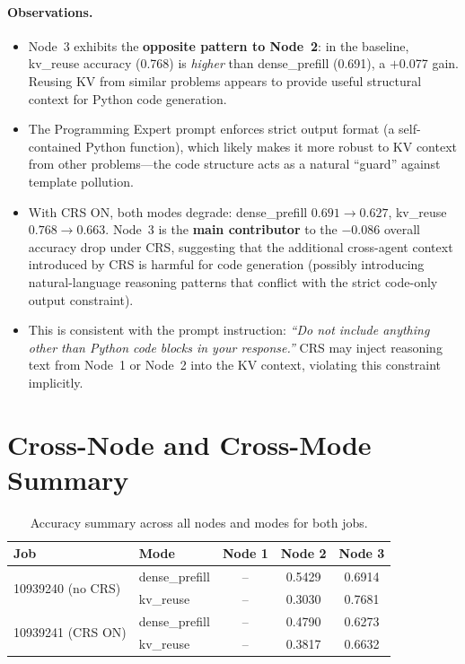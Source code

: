 \documentclass[11pt]{article}
\begin{document}
\paragraph{Observations.}
\begin{itemize}
  \item Node~3 exhibits the \textbf{opposite pattern to Node~2}: in the
        baseline, kv\_reuse accuracy (0.768) is \emph{higher} than
        dense\_prefill (0.691), a $+$0.077 gain.  Reusing KV from similar
        problems appears to provide useful structural context for Python code
        generation.
  \item The Programming Expert prompt enforces strict output format
        (a self-contained Python function), which likely makes it more
        robust to KV context from other problems---the code structure acts
        as a natural ``guard'' against template pollution.
  \item With CRS ON, both modes degrade: dense\_prefill $0.691 \to 0.627$,
        kv\_reuse $0.768 \to 0.663$.  Node~3 is the \textbf{main contributor}
        to the $-$0.086 overall accuracy drop under CRS, suggesting that
        the additional cross-agent context introduced by CRS is harmful for
        code generation (possibly introducing natural-language reasoning
        patterns that conflict with the strict code-only output constraint).
  \item This is consistent with the prompt instruction: \emph{``Do not include
        anything other than Python code blocks in your response.''} CRS may
        inject reasoning text from Node~1 or Node~2 into the KV context,
        violating this constraint implicitly.
\end{itemize}

\section{Cross-Node and Cross-Mode Summary}

\begin{table}[h]
\centering
\caption{Accuracy summary across all nodes and modes for both jobs.}
\label{tab:summary}
\begin{tabular}{llccc}
\toprule
\textbf{Job} & \textbf{Mode} & \textbf{Node 1} & \textbf{Node 2} & \textbf{Node 3} \\
\midrule
\multirow{2}{*}{10939240 (no CRS)}
  & dense\_prefill & -- & 0.5429 & 0.6914 \\
  & kv\_reuse      & -- & 0.3030 & 0.7681 \\
\midrule
\multirow{2}{*}{10939241 (CRS ON)}
  & dense\_prefill & -- & 0.4790 & 0.6273 \\
  & kv\_reuse      & -- & 0.3817 & 0.6632 \\
\bottomrule
\end{tabular}
\end{table}
\end{document}
